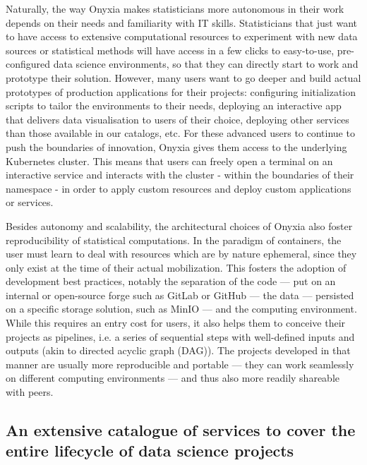 
Naturally, the way Onyxia makes statisticians more autonomous in their work depends on their needs and familiarity with IT skills. Statisticians that just want to have access to extensive computational resources to experiment with new data sources or statistical methods will have access in a few clicks to easy-to-use, pre-configured data science environments, so that they can directly start to work and prototype their solution. However, many users want to go deeper and build actual prototypes of production applications for their projects: configuring initialization scripts to tailor the environments to their needs, deploying an interactive app that delivers data visualisation to users of their choice, deploying other services than those available in our catalogs, etc. For these advanced users to continue to push the boundaries of innovation, Onyxia gives them access to the underlying Kubernetes cluster. This means that users can freely open a terminal on an interactive service and interacts with the cluster - within the boundaries of their namespace - in order to apply custom resources and deploy custom applications or services.

Besides autonomy and scalability, the architectural choices of Onyxia also foster reproducibility of statistical computations. In the paradigm of containers, the user must learn to deal with resources which are by nature ephemeral, since they only exist at the time of their actual mobilization. This fosters the adoption of development best practices, notably the separation of the code — put on an internal or open-source forge such as GitLab or GitHub — the data — persisted on a specific storage solution, such as MinIO — and the computing environment. While this requires an entry cost for users, it also helps them to conceive their projects as pipelines, i.e. a series of sequential steps with well-defined inputs and outputs (akin to directed acyclic graph (DAG)). The projects developed in that manner are usually more reproducible and portable — they can work seamlessly on different computing environments — and thus also more readily shareable with peers.


\label{ssec:catalog}
\subsection{An extensive catalogue of services to cover the entire lifecycle of data science projects}

